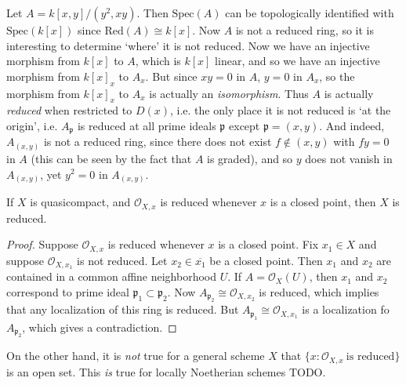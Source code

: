 \begin{example}
    Let $A = k[x,y]/(y^2,xy)$. Then $\text{Spec}(A)$ can be topologically identified with $\text{Spec}(k[x])$ since $\text{Red}(A) \cong k[x]$. Now $A$ is not a reduced  ring, so it is interesting to determine `where' it is not reduced. Now we have an injective morphism from $k[x]$ to $A$, which is $k[x]$ linear, and so we have an injective morphism from $k[x]_x$ to $A_x$. But since $xy = 0$ in $A$, $y = 0$ in $A_x$, so the morphism from $k[x]_x$ to $A_x$ is actually an \emph{isomorphism}. Thus $A$ is actually \emph{reduced} when restricted to $D(x)$, i.e. the only place it is not reduced is `at the origin', i.e. $A_{\mathfrak{p}}$ is reduced at all prime ideals $\mathfrak{p}$ except $\mathfrak{p} = (x,y)$. And indeed, $A_{(x,y)}$ is not a reduced ring, since there does not exist $f \not \in (x,y)$ with $fy = 0$ in $A$ (this can be seen by the fact that $A$ is graded), and so $y$ does not vanish in $A_{(x,y)}$, yet $y^2 = 0$ in $A_{(x,y)}$.
\end{example}

\begin{lemma}
    If $X$ is quasicompact, and $\mathcal{O}_{X,x}$ is reduced whenever $x$ is a closed point, then $X$ is reduced.
\end{lemma}
\begin{proof}
    Suppose $\mathcal{O}_{X,x}$ is reduced whenever $x$ is a closed point. Fix $x_1 \in X$ and suppose $\mathcal{O}_{X,x_1}$ is not reduced. Let $x_2 \in \overline{x_1}$ be a closed point. Then $x_1$ and $x_2$ are contained in a common affine neighborhood $U$. If $A = \mathcal{O}_X(U)$, then $x_1$ and $x_2$ correspond to prime ideal $\mathfrak{p_1} \subset \mathfrak{p_2}$. Now $A_{\mathfrak{p_2}} \cong \mathcal{O}_{X,x_2}$ is reduced, which implies that any localization of this ring is reduced. But $A_{\mathfrak{p_1}} \cong \mathcal{O}_{X,x_1}$ is a localization fo $A_{\mathfrak{p_2}}$, which gives a contradiction.
\end{proof}

On the other hand, it is \emph{not} true for a general scheme $X$ that $\{ x: \mathcal{O}_{X,x}\ \text{is reduced} \}$ is an open set. This \emph{is} true for locally Noetherian schemes TODO.

